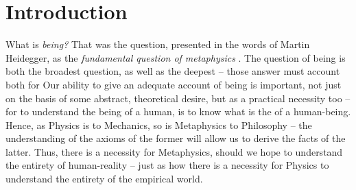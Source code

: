 \chapter{Introduction}





What is \emph{being?}  That was the question, presented in the words of Martin Heidegger, as the \emph{fundamental question of metaphysics} \autocite[1]{Heidegger}. The question of being is both the broadest question, as well as the deepest -- those answer must account both for  Our ability to give an adequate account of being is important, not just on the basis of some abstract, theoretical desire, but as a practical necessity too -- for to understand the being of a human, is to know what is the  of a human-being. Hence, as Physics is to Mechanics, so is Metaphysics to Philosophy -- the understanding of the axioms of the former will allow us to derive the facts of the latter. Thus, there is a necessity for Metaphysics, should we hope to understand the entirety of human-reality -- just as how there is a necessity for Physics to understand the entirety of the empirical world.




